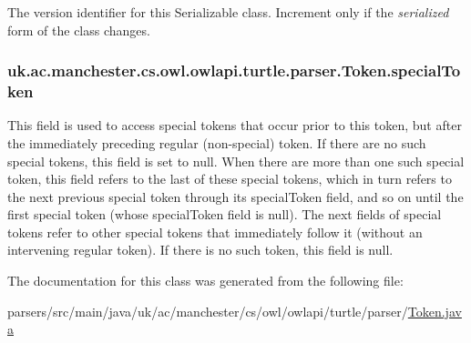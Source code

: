 The version identifier for this Serializable class. Increment only if the {\itshape serialized} form of the class changes. \hypertarget{classuk_1_1ac_1_1manchester_1_1cs_1_1owl_1_1owlapi_1_1turtle_1_1parser_1_1_token_ad1aa05670100701b3daba21f635b58a6}{
\subsubsection[{special\-Token}]{ uk.\-ac.\-manchester.\-cs.\-owl.\-owlapi.\-turtle.\-parser.\-Token.\-special\-Token}}\label{classuk_1_1ac_1_1manchester_1_1cs_1_1owl_1_1owlapi_1_1turtle_1_1parser_1_1_token_ad1aa05670100701b3daba21f635b58a6}
This field is used to access special tokens that occur prior to this token, but after the immediately preceding regular (non-\/special) token. If there are no such special tokens, this field is set to null. When there are more than one such special token, this field refers to the last of these special tokens, which in turn refers to the next previous special token through its special\-Token field, and so on until the first special token (whose special\-Token field is null). The next fields of special tokens refer to other special tokens that immediately follow it (without an intervening regular token). If there is no such token, this field is null. 

The documentation for this class was generated from the following file\-:\begin{DoxyCompactItemize}
\item 
parsers/src/main/java/uk/ac/manchester/cs/owl/owlapi/turtle/parser/\hyperlink{uk_2ac_2manchester_2cs_2owl_2owlapi_2turtle_2parser_2_token_8java}{Token.\-java}\end{DoxyCompactItemize}
